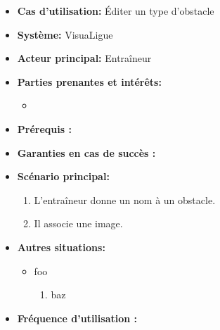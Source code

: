 \begin{itemize}
    \item \textbf{Cas d'utilisation:} \'Editer un type d'obstacle
    \item \textbf{Syst\`eme:} VisuaLigue
    \item \textbf{Acteur principal:} Entra\^ineur
    \item \textbf{Parties prenantes et int\'er\^ets:}
    	\begin{itemize}
    		\item
    	\end{itemize}
    \item \textbf{Pr\'erequis :}
    \item \textbf{Garanties en cas de succ\`es :}
    \item \textbf{Sc\'enario principal:}
        \begin{enumerate}
            \item L'entraîneur donne un nom à un obstacle.
            \item Il associe une image.
        \end{enumerate}
    \item \textbf{Autres situations:}
        \begin{itemize}
            \item foo
                \begin{enumerate}
                    \item baz
                \end{enumerate}
        \end{itemize}
    \item \textbf{Fréquence d'utilisation :}
\end{itemize}



